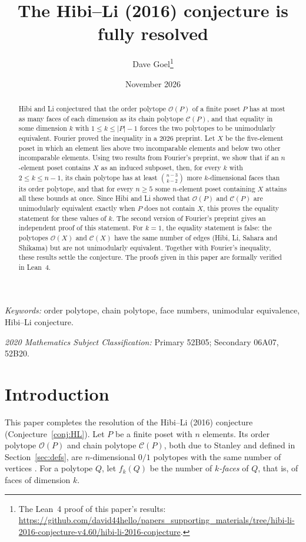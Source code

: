 \documentclass[11pt]{article}
\title{The Hibi--Li (2016) conjecture is fully resolved}
\author{Dave Goel\thanks{The Lean~4 proof of this paper's results:
\url{https://github.com/david44hello/papers_supporting_materials/tree/hibi-li-2016-conjecture-v4.60/hibi-li-2016-conjecture}.}}
\date{\small November 2026}
\theoremstyle{definition}
\theoremstyle{remark}
\newcommand{\OO}{\mathcal O}
\newcommand{\CC}{\mathcal C}
\begin{document}
\maketitle

\begin{abstract}
Hibi and Li conjectured that the order polytope $\OO(P)$ of a finite
poset $P$ has at most as many faces of each dimension as its chain
polytope $\CC(P)$, and that equality in some dimension $k$ with
$1\leq k\leq|P|-1$ forces the two polytopes to be unimodularly
equivalent. Fourier proved the
inequality in a 2026 preprint. Let $X$ be the five-element poset in
which an element lies above two incomparable elements and below
two other incomparable elements. Using two results from Fourier's preprint, we show that
if an $n$-element poset contains $X$ as an induced subposet, then, for
every $k$ with $2\leq k\leq n-1$, its chain polytope has at least
$\binom{n-3}{k-2}$ more $k$-dimensional faces than its order polytope,
and that for every $n\geq5$ some $n$-element poset containing $X$ attains all these
bounds at once. Since Hibi and Li showed that $\OO(P)$ and $\CC(P)$
are unimodularly equivalent exactly when $P$ does not contain $X$, this proves the equality statement for these values of $k$. The second version of Fourier's preprint
gives an independent proof of this statement. For $k=1$, the equality statement is false: the polytopes $\OO(X)$ and $\CC(X)$ have the same number of edges (Hibi, Li, Sahara and
Shikama) but are not unimodularly equivalent.
Together with Fourier's inequality, these results settle the conjecture. The
proofs given in this paper are formally verified in Lean~4.
\end{abstract}

{\small\noindent\textit{Keywords:} order polytope, chain polytope, face numbers, unimodular equivalence,
Hibi--Li conjecture.

\noindent\textit{2020 Mathematics Subject Classification:} Primary 52B05; Secondary 06A07, 52B20.\par}

\section{Introduction}\label{sec:intro}
This paper completes the resolution of the Hibi--Li (2016) conjecture
(Conjecture~\ref{conj:HL}). Let $P$ be a finite poset with $n$
elements. Its order polytope $\OO(P)$ and chain polytope $\CC(P)$,
both due to Stanley and defined in
Section~\ref{sec:defs}, are $n$-dimensional $0/1$ polytopes with
the same number of vertices \cite[Corollary~1.3 and Theorem~2.2]{Stanley}. For a polytope $Q$, let
$f_k(Q)$ be the number of \emph{$k$-faces} of $Q$, that is, of faces of dimension $k$.
\end{document}
